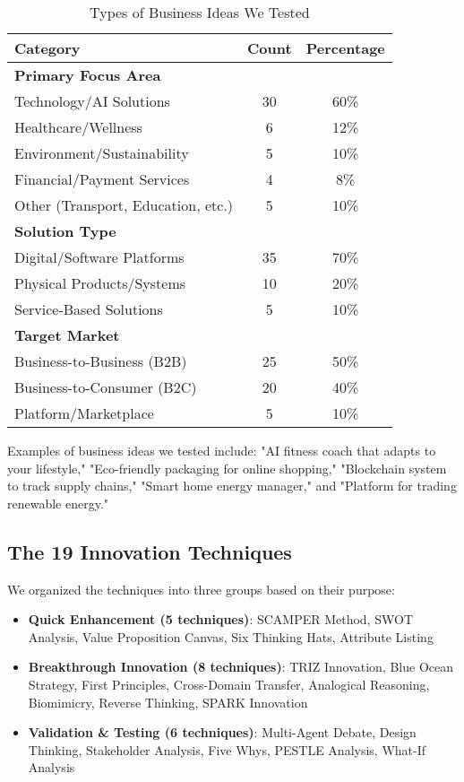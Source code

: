 \documentclass[12pt]{article}
\begin{document}
\begin{table}[H]
\centering
\caption{Types of Business Ideas We Tested}
\label{tab:dataset}
\begin{tabular}{@{}lcc@{}}
\toprule
Category & Count & Percentage \\
\midrule
\textbf{Primary Focus Area} & & \\
Technology/AI Solutions & 30 & 60\% \\
Healthcare/Wellness & 6 & 12\% \\
Environment/Sustainability & 5 & 10\% \\
Financial/Payment Services & 4 & 8\% \\
Other (Transport, Education, etc.) & 5 & 10\% \\
\midrule
\textbf{Solution Type} & & \\
Digital/Software Platforms & 35 & 70\% \\
Physical Products/Systems & 10 & 20\% \\
Service-Based Solutions & 5 & 10\% \\
\midrule
\textbf{Target Market} & & \\
Business-to-Business (B2B) & 25 & 50\% \\
Business-to-Consumer (B2C) & 20 & 40\% \\
Platform/Marketplace & 5 & 10\% \\
\bottomrule
\end{tabular}
\end{table}

Examples of business ideas we tested include: "AI fitness coach that adapts to your lifestyle," "Eco-friendly packaging for online shopping," "Blockchain system to track supply chains," "Smart home energy manager," and "Platform for trading renewable energy."

\subsection{The 19 Innovation Techniques}

We organized the techniques into three groups based on their purpose:

\begin{itemize}
\item \textbf{Quick Enhancement (5 techniques)}: SCAMPER Method, SWOT Analysis, Value Proposition Canvas, Six Thinking Hats, Attribute Listing
\item \textbf{Breakthrough Innovation (8 techniques)}: TRIZ Innovation, Blue Ocean Strategy, First Principles, Cross-Domain Transfer, Analogical Reasoning, Biomimicry, Reverse Thinking, SPARK Innovation  
\item \textbf{Validation \& Testing (6 techniques)}: Multi-Agent Debate, Design Thinking, Stakeholder Analysis, Five Whys, PESTLE Analysis, What-If Analysis
\end{itemize}
\end{document}
